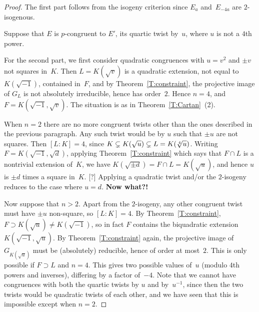\documentclass[12pt, reqno]{amsart}
\newcommand{\PP}{\mathbb{P}}
\newcommand{\rhobar}{{\overline{\rho}}}
\numberwithin{equation}{section}
\theoremstyle{definition}
\theoremstyle{remark}
\begin{document}
\begin{proof}
The first part follows from the isogeny criterion since $E_a$
and~$E_{-4a}$ are $2$-isogenous.

Suppose that $E$ is $p$-congruent to $E'$, its quartic twist by~$u$,
where $u$ is not a $4$th power.

For the second part, we first consider quadratic congruences with
$u=v^2$ and $\pm v$ not squares in~$K$.  Then $L=K(\sqrt{v})$ is a
quadratic extension, not equal to $K(\sqrt{-1})$, contained in~$F$,
and by Theorem~\ref{T:constraint}, the projective image of $G_L$ is
not absolutely irreducible, hence has order~$2$.  Hence $n=4$, and
$F=K(\sqrt{-1}, \sqrt{v})$.  The situation is as in
Theorem~\ref{T:Cartan}~(2).

When $n=2$ there are no more congruent twists other than the ones
described in the previous paragraph.  Any such twist would be by $u$
such that $\pm u$ are not squares.  Then $[L:K]=4$, since $K\subsetneq
K(\sqrt{u})\subsetneq L=K(\root4\of{u})$.  Writing
$F=K(\sqrt{-1},\sqrt{d})$, applying Theorem~\ref{T:constraint} which
says that $F\cap L$ is a nontrivial extension of~$K$, we have
$K(\sqrt{\pm d}) = F\cap L= K(\sqrt{u})$, and hence $u$ is $\pm d$
times a square in~$K$.  [?] Applying a quadratic twist and/or the
$2$-isogeny reduces to the case where $u=d$. \textbf{Now what?!}

Now suppose that $n>2$.  Apart from the $2$-isogeny, any other
congruent twist must have $\pm u$ non-square, so $[L:K]=4$.  By
Theorem~\ref{T:constraint}, $F\supset K(\sqrt{u})\not=K(\sqrt{-1})$,
so in fact $F$ contains the biquadratic
extension~$K(\sqrt{-1},\sqrt{u})$.  By Theorem~\ref{T:constraint}
again, the projective image of $G_{K(\sqrt{u})}$ must be (absolutely)
reducible, hence of order at most~$2$.  This is only possible if
$F\supset L$ and $n=4$.  This gives two possible values of~$u$ (modulo
$4$th powers and inverses), differing by a factor of~$-4$.  Note that
we cannot have congruences with both the quartic twists by $u$ and
by~$u^{-1}$, since then the two twists would be quadratic twists of
each other, and we have seen that this is impossible except when
$n=2$.
\end{proof}



\end{document}
